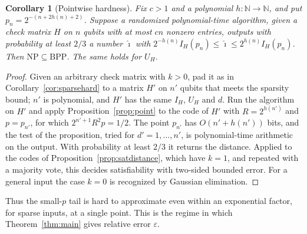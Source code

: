 \documentclass[11pt]{article}
\newtheorem{corollary}[theorem]{Corollary}
\theoremstyle{remark}
\newcommand{\eps}{\varepsilon}
\begin{document}
\begin{corollary}[Pointwise hardness]\label{cor:pointhard}
Fix \(c>1\) and a polynomial \(h\colon\mathbb N\to\mathbb N\), and put
\(p_n=2^{-(n+2h(n)+2)}\). Suppose a randomized polynomial-time algorithm,
given a check matrix \(H\) on \(n\) qubits with at most \(cn\) nonzero
entries, outputs with probability at least \(2/3\) a number
\(\widehat\imath\) with
\(2^{-h(n)}I_H(p_n)\le\widehat\imath\le2^{h(n)}I_H(p_n)\). Then
\(\mathrm{NP}\subseteq\mathrm{BPP}\). The same holds for \(U_H\).
\end{corollary}
\begin{proof}
Given an arbitrary check matrix with \(k>0\), pad it as in
Corollary~\ref{cor:sparsehard} to a matrix \(H'\) on \(n'\) qubits that
meets the sparsity bound; \(n'\) is polynomial, and \(H'\) has the same
\(I_H\), \(U_H\) and \(d\). Run the algorithm on \(H'\) and apply
Proposition~\ref{prop:point} to the code of \(H'\) with
\(R=2^{h(n')}\) and \(p=p_{n'}\), for which \(2^{n'+1}R^2p=1/2\). The
point \(p_{n'}\) has \(O(n'+h(n'))\) bits, and the test of the
proposition, tried for \(d'=1,\ldots,n'\), is polynomial-time arithmetic
on the output. With probability at least \(2/3\) it returns the distance.
Applied to the codes of Proposition~\ref{prop:satdistance}, which have
\(k=1\), and repeated with a majority vote, this decides
satisfiability with two-sided bounded error. For a general input the
case \(k=0\) is recognized by Gaussian elimination.
\end{proof}

Thus the small-\(p\) tail is hard to approximate even within an
exponential factor, for sparse inputs, at a single point. This is the
regime in which Theorem~\ref{thm:main} gives relative error \(\eps\).
\end{document}
